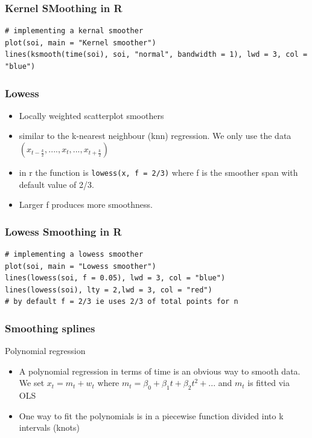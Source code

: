 \documentclass{article}
\begin{document}
\subsubsection{Kernel SMoothing in R}
\begin{lstlisting}
# implementing a kernal smoother
plot(soi, main = "Kernel smoother")
lines(ksmooth(time(soi), soi, "normal", bandwidth = 1), lwd = 3, col = "blue")
\end{lstlisting}

\subsubsection{Lowess}
\begin{itemize}
    \item Locally weighted scatterplot smoothers
    \item similar to the k-nearest neighbour (knn) regression. We only use the data $(x_{t - \frac{k}{2}}, ...., x_t, ..., x_{t+ \frac{k}{2}})$
    \item in r the function is \texttt{lowess(x, f = 2/3)} where f is the smoother span with default value of 2/3.
    \item Larger f produces more smoothness.
\end{itemize}

\subsubsection{Lowess Smoothing in R}
\begin{lstlisting}
# implementing a lowess smoother
plot(soi, main = "Lowess smoother")
lines(lowess(soi, f = 0.05), lwd = 3, col = "blue")
lines(lowess(soi), lty = 2,lwd = 3, col = "red") 
# by default f = 2/3 ie uses 2/3 of total points for n
\end{lstlisting}

\subsubsection{Smoothing splines}
\noindent Polynomial regression
\begin{itemize}
    \item A polynomial regression in terms of time is an obvious way to smooth data. We set $x_t = m_t + w_t$ where $m_t = \beta_0 + \beta_1 t + \beta_2 t^2 + ...$ and $m_t$ is fitted via OLS
    \item One way to fit the polynomials is in a piecewise function divided into k intervals (knots)
\end{itemize}
\end{document}

